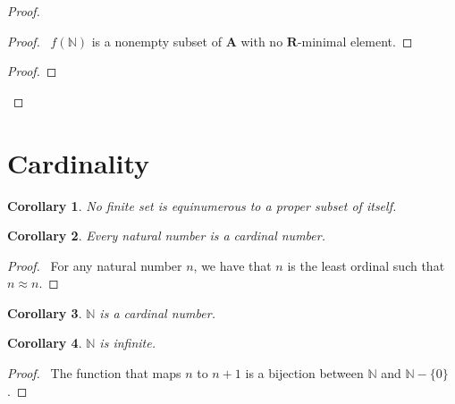 \documentclass{book}
\let\qed\relax
\newtheorem{cor}{Corollary}[ax]
\theoremstyle{definition}
\begin{document}
\begin{proof}
\pf
{}
\begin{proof}
	\pf\ $f(\mathbb{N})$ is a nonempty subset of $\mathbf{A}$ with no $\mathbf{R}$-minimal element.
\end{proof}
\begin{proof}
\end{proof}
\qed
\end{proof}

\section{Cardinality}


\begin{cor}
No finite set is equinumerous to a proper subset of itself.
\end{cor}

\begin{cor}
Every natural number is a cardinal number.
\end{cor}

\begin{proof}
\pf\ For any natural number $n$, we have that $n$ is the least ordinal such that $n \approx n$. \qed
\end{proof}

\begin{cor}
$\mathbb{N}$ is a cardinal number.
\end{cor}

\begin{cor}
$\mathbb{N}$ is infinite.
\end{cor}

\begin{proof}
\pf\ The function that maps $n$ to $n+1$ is a bijection between $\mathbb{N}$ and $\mathbb{N} - \{0\}$. \qed
\end{proof}
\end{document}

